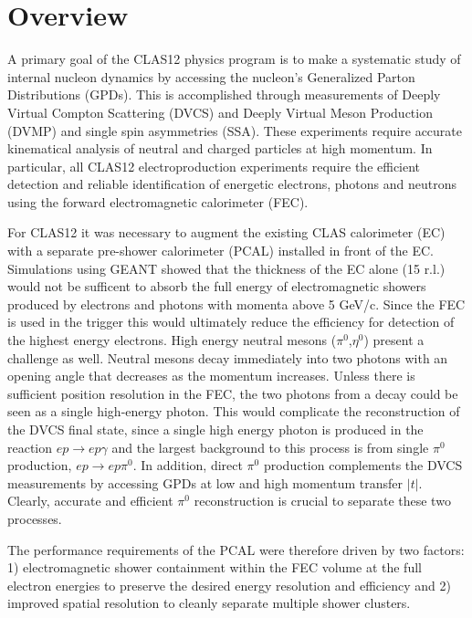 \section{Overview}

A primary goal of the CLAS12 physics program is to make a systematic study of internal nucleon dynamics by accessing the nucleon's Generalized Parton Distributions (GPDs). This is accomplished through measurements of Deeply Virtual Compton Scattering (DVCS) and Deeply Virtual Meson Production (DVMP) and single spin asymmetries (SSA). These experiments require accurate kinematical analysis of neutral and charged particles at high momentum. In particular, all CLAS12 electroproduction experiments require the efficient detection and reliable identification of energetic electrons, photons and neutrons using the forward electromagnetic calorimeter (FEC).

For CLAS12 it was necessary to augment the existing CLAS calorimeter (EC) \cite{clas6nim} with a separate pre-shower calorimeter (PCAL) installed in front of the EC.  Simulations using GEANT showed that the thickness of the EC alone (15 r.l.) would not be sufficent to absorb the full energy of electromagnetic showers produced by electrons and photons with momenta above 5 GeV/c. Since the FEC is used in the trigger this would ultimately reduce the efficiency for detection of the highest energy electrons.  High energy neutral mesons ($\pi^{0}$,$\eta^{0}$) present a challenge as well. Neutral mesons decay immediately into two photons with an opening angle that decreases as the momentum increases. Unless there is sufficient position resolution in the FEC, the two photons from a decay could be seen as a single high-energy photon.  This would complicate the reconstruction of the DVCS final state, since a single high energy photon is produced in the reaction $ep \to ep\gamma$ and the largest background to this process is from single $\pi^{0}$ production, $ep \to ep\pi^{0}$.  In addition, direct $\pi^{0}$ production complements the DVCS measurements by accessing GPDs at low and high momentum transfer $|t|$. Clearly, accurate and efficient $\pi^{0}$ reconstruction is crucial to separate these two processes. 

The performance requirements of the PCAL were therefore driven by two factors: 1) electromagnetic shower containment within the FEC volume at the full electron energies to preserve the desired energy resolution and efficiency and 2) improved spatial resolution to cleanly separate multiple shower clusters.  




